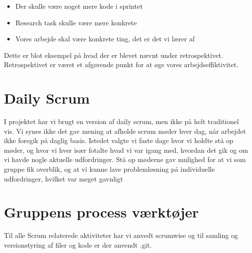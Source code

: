 \begin{itemize}
	\item Der skulle være noget mere kode  i sprintet
	\item Research task skulle være mere konkrete
	\item Vores arbejde skal være konkrete ting, det er det vi lærer af
\end{itemize}

Dette er blot eksempel på hvad der er blevet nævnt under retrospektivet. Retrospektivet er været et afgørende punkt for at øge vores arbejdseffiktivitet.

\section{Daily Scrum}
I projektet har vi brugt en version af daily scrum, men ikke på helt traditionel vis. Vi synes ikke det gav mening at afholde scrum møder hver dag, når arbejdet ikke foregik på daglig basis. Istedet valgte vi faste dage hvor vi holdte stå op møder, og hvor vi hver især fotalte hvad vi var igang med, hvordan det gik og om vi havde nogle aktuelle udfordringer. Stå op møderne gav mulighed for at vi som gruppe fik overblik, og at vi kunne lave problemløsning på individuelle udfordringer, hvilket var meget gavnligt

\section{Gruppens process værktøjer}
Til alle Scrum relaterede aktiviteter har vi anvedt scrumwise og til samling og versionstyring af filer og kode er der anvendt .git. 


